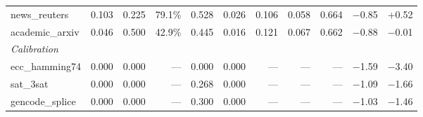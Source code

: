 \documentclass[final]{clv2025}
\begin{document}
\begin{landscape}
\begin{table}[p]
\begin{tabular}{lrrrrrrrrrr}
news\_reuters & 0.103 & 0.225 & 79.1\% & 0.528 & 0.026 & 0.106 & 0.058 & 0.664 & $-$0.85 & +0.52 \\
academic\_arxiv & 0.046 & 0.500 & 42.9\% & 0.445 & 0.016 & 0.121 & 0.067 & 0.662 & $-$0.88 & $-$0.01 \\
\midrule
\multicolumn{11}{l}{\textit{Calibration}} \\
ecc\_hamming74 & 0.000 & 0.000 & --- & 0.000 & 0.000 & --- & --- & --- & $-$1.59 & $-$3.40 \\
sat\_3sat & 0.000 & 0.000 & --- & 0.268 & 0.000 & --- & --- & --- & $-$1.09 & $-$1.66 \\
gencode\_splice & 0.000 & 0.000 & --- & 0.300 & 0.000 & --- & --- & --- & $-$1.03 & $-$1.46 \\
\bottomrule
\end{tabular}
\end{table}


\end{landscape}
\end{document}
